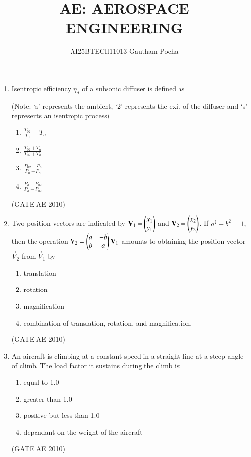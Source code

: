 \documentclass[journal]{IEEEtran}
\begin{document}
\title{
AE: AEROSPACE ENGINEERING}
\author{AI25BTECH11013-Gautham Pocha}
\maketitle
\renewcommand{\thefigure}{\theenumi}
\renewcommand{\thetable}{\theenumi}


\begin{enumerate}
\item Isentropic efficiency $ \eta_d $ of a subsonic diffuser is defined as 

(Note: ‘a’ represents the ambient, ‘2’ represents the exit of the diffuser and ‘s’ represents an isentropic process)
\begin{multicols}{4}
\begin{enumerate}
\item $ \frac{T_{02}}{T_0} - T_a $
\item $ \frac{T_{02} + T_a}{T_{02} + T_a} $
\item $ \frac{P_{02} - P_a}{P_0 - P_a} $
\item $ \frac{P_a - P_{02}}{P_a - P_{02}} $
\end{enumerate}
\end{multicols}
\hfill (GATE AE 2010)

\item Two position vectors are indicated by $ \mathbf{V}_1 = \begin{pmatrix}x_1 \\ y_1\end{pmatrix} $ and $ \mathbf{V}_2 = \begin{pmatrix}x_2 \\ y_2\end{pmatrix} $. If $ a^2 + b^2 = 1 $, then the operation $ \mathbf{V}_2 = \begin{pmatrix}a & -b \\ b & a\end{pmatrix} \mathbf{V}_1 $ amounts to obtaining the position vector $ \vec{V}_2 $ from $ \vec{V}_1 $ by
\begin{enumerate}
\item translation
\item rotation
\item magnification
\item combination of translation, rotation, and magnification.
\end{enumerate}
\hfill (GATE AE 2010)

\item An aircraft is climbing at a constant speed in a straight line at a steep angle of climb. The load factor it sustains during the climb is:
\begin{multicols}{2}
\begin{enumerate}
\item equal to 1.0
\item greater than 1.0
\item positive but less than 1.0
\item dependant on the weight of the aircraft
\end{enumerate}
\end{multicols}
\hfill (GATE AE 2010)


\end{enumerate}
\end{document}
